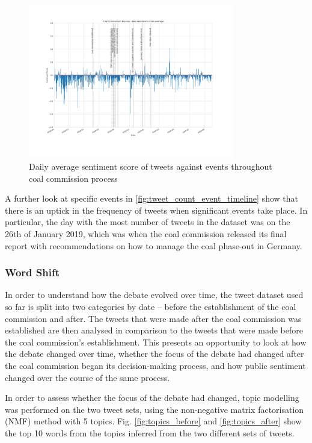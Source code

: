 \documentclass[10pt,twocolumn,twoside]{layout}
\begin{document}
\begin{figure}[bp] 
	\begin{center}
		\includegraphics[width=0.8\textwidth]{figures/tweet_score_event_timeline}
	\end{center}
	\caption{Daily average sentiment score of tweets against events throughout coal commission process}
	\label{fig:tweet_score_event_timeline}
\end{figure}

A further look at specific events in \ref{fig:tweet_count_event_timeline} show that there is an uptick in the frequency of tweets when significant events take place. In particular, the day with the most number of tweets in the dataset was on the 26th of January 2019, which was when the coal commission released its final report with recommendations on how to manage the coal phase-out in Germany. 

\subsubsection*{Word Shift}
In order to understand how the debate evolved over time, the tweet dataset used so far is split into two categories by date -- before the establishment of the coal commission and after. The tweets that were made after the coal commission was established are then analysed in comparison to the tweets that were made before the coal commission's establishment. This presents an opportunity to look at how the debate changed over time, whether the focus of the debate had changed after the coal commission began its decision-making process, and how public sentiment changed over the course of the same process. 

In order to assess whether the focus of the debate had changed, topic modelling was performed on the two tweet sets, using the non-negative matrix factorisation (NMF) method with 5 topics. Fig. \ref{fig:topics_before} and \ref{fig:topics_after} show the top 10 words from the topics inferred from the two different sets of tweets. 
\end{document}

